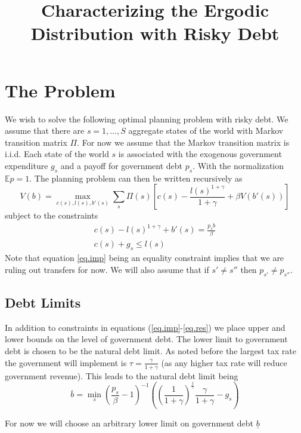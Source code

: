 \documentclass[12pt]{article}
\title{Characterizing the Ergodic Distribution with Risky Debt}
\date{}
\newcommand{\EE}{\mathbb E}
\begin{document}
\maketitle
\section{The Problem}
We wish to solve the following optimal planning problem with risky debt.  We assume that there are $s = 1,\ldots,S$ aggregate states of the world with Markov transition matrix $\Pi$.  For now we assume that the Markov transition matrix is i.i.d.  Each state of the world $s$ is associated with the exogenous government expenditure $g_s$ and a payoff for government debt $p_s$.  With the normalization $\EE p = 1$.  The planning problem can then be written recursively as 
\[
	V(b) = \max_{c(s),l(s),b'(s)}\sum_s \Pi(s)\left[ c(s) - \frac{l(s)^{1+\gamma}}{1+\gamma}+ \beta V(b'(s)) \right]
\]subject to the constraints
\begin{subequations}
\begin{align}\label{eq.imp}
	c(s) - l(s)^{1+\gamma}  + b'(s)  = \frac{p_s b}{\beta}\\
	c(s) + g_s  \leq l(s)\label{eq.res}
\end{align}
\end{subequations} Note that equation \eqref{eq.imp} being an equality constraint implies that we are ruling out transfers for now.  We will also assume that if $s'\neq s''$ then $p_{s'}\neq p_{s''}$.
\subsection{Debt Limits}
In addition to constraints in equations (\ref{eq.imp}-\ref{eq.res}) we place upper and lower bounds on the level of government debt.  The lower limit to government debt is chosen to be the natural debt limit.  As noted before the largest tax rate the government will implement is $\tau = \frac{\gamma}{1+\gamma}$ (as any higher tax rate will reduce government revenue).  This leads to the natural debt limit being 
\begin{equation}
	\overline b = \min_{s}\left(\frac{p_s}{\beta}-1\right)^{-1}\left(\left(\frac1{1+\gamma}\right)^\frac1\gamma\frac\gamma{1+\gamma} - g_s\right)
\end{equation}

For now we will choose an arbitrary lower limit on government debt $\underline b$
\end{document}
